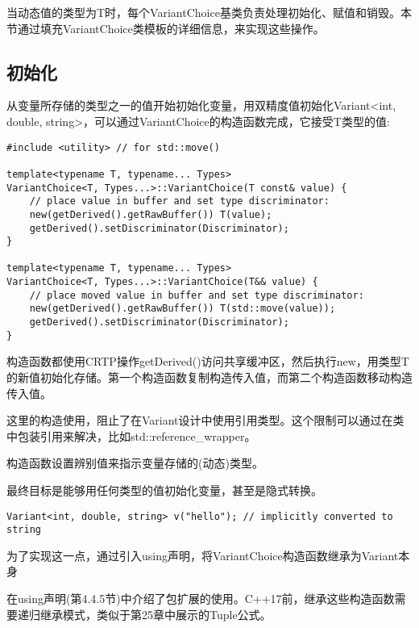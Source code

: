 

当动态值的类型为T时，每个VariantChoice基类负责处理初始化、赋值和销毁。本节通过填充VariantChoice类模板的详细信息，来实现这些操作。


\subsection{初始化}

从变量所存储的类型之一的值开始初始化变量，用双精度值初始化Variant<int, double, string>，可以通过VariantChoice的构造函数完成，它接受T类型的值:

\begin{lstlisting}[style=styleCXX]
#include <utility> // for std::move()

template<typename T, typename... Types>
VariantChoice<T, Types...>::VariantChoice(T const& value) {
	// place value in buffer and set type discriminator:
	new(getDerived().getRawBuffer()) T(value);
	getDerived().setDiscriminator(Discriminator);
}

template<typename T, typename... Types>
VariantChoice<T, Types...>::VariantChoice(T&& value) {
	// place moved value in buffer and set type discriminator:
	new(getDerived().getRawBuffer()) T(std::move(value));
	getDerived().setDiscriminator(Discriminator);
}
\end{lstlisting}

构造函数都使用CRTP操作getDerived()访问共享缓冲区，然后执行new，用类型T的新值初始化存储。第一个构造函数复制构造传入值，而第二个构造函数移动构造传入值。

\begin{tcolorbox}[colback=webgreen!5!white,colframe=webgreen!75!black]
\hspace*{0.75cm}这里的构造使用，阻止了在Variant设计中使用引用类型。这个限制可以通过在类中包装引用来解决，比如std::reference\_wrapper。
\end{tcolorbox}

构造函数设置辨别值来指示变量存储的(动态)类型。

最终目标是能够用任何类型的值初始化变量，甚至是隐式转换。

\begin{lstlisting}[style=styleCXX]
Variant<int, double, string> v("hello"); // implicitly converted to string
\end{lstlisting}

为了实现这一点，通过引入using声明，将VariantChoice构造函数继承为Variant本身

\begin{tcolorbox}[colback=webgreen!5!white,colframe=webgreen!75!black]
\hspace*{0.75cm}在using声明(第4.4.5节)中介绍了包扩展的使用。C++17前，继承这些构造函数需要递归继承模式，类似于第25章中展示的Tuple公式。
\end{tcolorbox}

